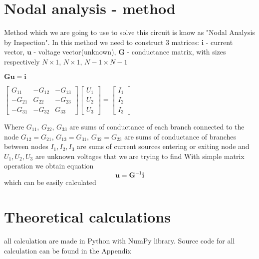 \documentclass[notitlepage, a4paper, 11pt]{article}
\begin{document}
	\section{Nodal analysis - method}
	Method which we are going to use to solve this circuit is know as "Nodal Analysis by Inspection". In this method we need to construct 3 matrices: $\mathbf{i}$ - current vector, $\mathbf{u}$ - voltage vector(unknown), $\mathbf{G}$ - conductance matrix, with sizes respectively $\mathit{N} \times 1$, $\mathit{N} \times 1$, $\mathit{N}-1 \times \mathit{N}-1$

		\begin{center} $\mathbf{Gu=i}$ \end{center}
		\begin{center}
			\begin{math}
				\begin{bmatrix}
					G_{11} & -G_{12} & -G_{13} \\
					-G_{21} & G_{22} & -G_{23} \\
					-G_{31} & -G_{32} & G_{33} 
				\end{bmatrix}
				\begin{bmatrix}
					U_1 \\
					U_2 \\ 
					U_3
				\end{bmatrix}
				=
				\begin{bmatrix}
					I_1 \\
					I_2 \\
					I_3
				\end{bmatrix}
			\end{math}
		\end{center}
		Where $G_{11}$, $G_{22}$, $G_{33}$ are sums of conductance of each branch connected to the node \newline $G_{12} = G_{21}$, $G_{13} = G_{31}$, $G_{32} = G_{23}$ are sums of conductance of branches between nodes \newline $I_1, I_2, I_3$ are sums of current sources entering or exiting node and $U_1, U_2, U_3$ are unknown voltages that we are trying to find
		\newline\newline
		With simple matrix operation we obtain equation
		$$
		\mathbf{u} = \mathbf{G}^{-1}\mathbf{i}
		$$
		which can be easily calculated
	\section{Theoretical calculations}
	all calculation are made in Python with NumPy library. Source code for all calculation can be found in the Appendix
\end{document}
